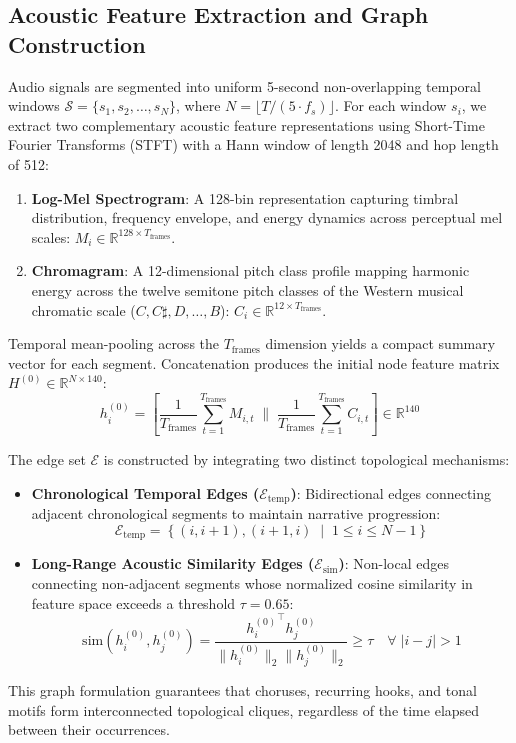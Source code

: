 \documentclass{article}
\begin{document}
\subsection{Acoustic Feature Extraction and Graph Construction}
Audio signals are segmented into uniform 5-second non-overlapping temporal windows $\mathcal{S} = \{s_1, s_2, \dots, s_N\}$, where $N = \lfloor T / (5 \cdot f_s) \rfloor$. For each window $s_i$, we extract two complementary acoustic feature representations using Short-Time Fourier Transforms (STFT) with a Hann window of length 2048 and hop length of 512:
\begin{enumerate}
    \item \textbf{Log-Mel Spectrogram}: A 128-bin representation capturing timbral distribution, frequency envelope, and energy dynamics across perceptual mel scales: $M_i \in \mathbb{R}^{128 \times T_{\text{frames}}}$.
    \item \textbf{Chromagram}: A 12-dimensional pitch class profile mapping harmonic energy across the twelve semitone pitch classes of the Western musical chromatic scale ($C, C\sharp, D, \dots, B$): $C_i \in \mathbb{R}^{12 \times T_{\text{frames}}}$.
\end{enumerate}

Temporal mean-pooling across the $T_{\text{frames}}$ dimension yields a compact summary vector for each segment. Concatenation produces the initial node feature matrix $H^{(0)} \in \mathbb{R}^{N \times 140}$:
\begin{equation}
h_i^{(0)} = \left[ \frac{1}{T_{\text{frames}}} \sum_{t=1}^{T_{\text{frames}}} M_{i, t} \;\Big\|\; \frac{1}{T_{\text{frames}}} \sum_{t=1}^{T_{\text{frames}}} C_{i, t} \right] \in \mathbb{R}^{140}
\end{equation}

The edge set $\mathcal{E}$ is constructed by integrating two distinct topological mechanisms:
\begin{itemize}
    \item \textbf{Chronological Temporal Edges ($\mathcal{E}_{\text{temp}}$)}: Bidirectional edges connecting adjacent chronological segments to maintain narrative progression:
    \begin{equation}
    \mathcal{E}_{\text{temp}} = \left\{ (i, i+1), (i+1, i) \;\mid\; 1 \le i \le N-1 \right\}
    \end{equation}
    \item \textbf{Long-Range Acoustic Similarity Edges ($\mathcal{E}_{\text{sim}}$)}: Non-local edges connecting non-adjacent segments whose normalized cosine similarity in feature space exceeds a threshold $\tau = 0.65$:
    \begin{equation}
    \text{sim}\left(h_i^{(0)}, h_j^{(0)}\right) = \frac{{h_i^{(0)}}^\top h_j^{(0)}}{\|h_i^{(0)}\|_2 \|h_j^{(0)}\|_2} \ge \tau \quad \forall \; |i - j| > 1
    \end{equation}
\end{itemize}
This graph formulation guarantees that choruses, recurring hooks, and tonal motifs form interconnected topological cliques, regardless of the time elapsed between their occurrences.
\end{document}
